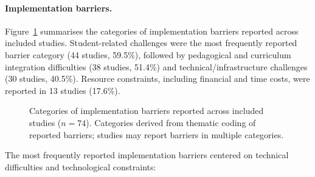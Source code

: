 \documentclass[a4paper,fleqn]{cas-sc}
\begin{document}
\paragraph{Implementation barriers.}

Figure~\ref{fig:implementation_barriers} summarises the categories of implementation barriers reported across included studies. Student-related challenges were the most frequently reported barrier category (44 studies, 59.5\%), followed by pedagogical and curriculum integration difficulties (38 studies, 51.4\%) and technical/infrastructure challenges (30 studies, 40.5\%). Resource constraints, including financial and time costs, were reported in 13 studies (17.6\%).

\begin{figure}[ht!]
\centering
{}
\caption{Categories of implementation barriers reported across included studies ($n=74$). Categories derived from thematic coding of reported barriers; studies may report barriers in multiple categories.}
\label{fig:implementation_barriers}
\end{figure}


The most frequently reported implementation barriers centered on technical difficulties and technological constraints:
\end{document}
